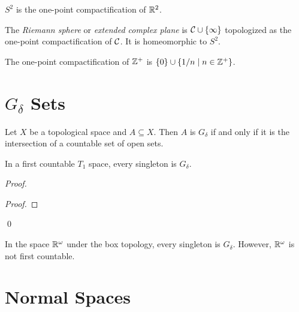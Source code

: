 \begin{example}
    $S^2$ is the one-point compactification of $\mathbb{R}^2$.
\end{example}

\begin{definition}
    The \emph{Riemann sphere} or \emph{extended complex plane} is $\mathcal{C} \cup \{ \infty \}$
    topologized as the one-point compactification of $\mathcal{C}$. It is homeomorphic to $S^2$.
\end{definition}

\begin{example}
    The one-point compactification of $\mathbb{Z}^+$ is $\{0\} \cup \{ 1/n \mid n \in \mathbb{Z}^+ \}$.
\end{example}

\section{$G_\delta$ Sets}

\begin{definition}
    Let $X$ be a topological space and $A \subseteq X$. Then $A$ is \emph{$G_\delta$}
    if and only if it is the intersection of a countable set of open sets.
\end{definition}

\begin{proposition}
    In a first countable $T_1$ space, every singleton is $G_\delta$.
\end{proposition}

\begin{proof}
    \pf
    \begin{proof}
    \end{proof}
    \qed
\end{proof}

\begin{example}
    In the space $\mathbb{R}^\omega$ under the box topology, every singleton is $G_\delta$.
    However, $\mathbb{R}^\omega$ is not first countable.
\end{example}

\section{Normal Spaces}

